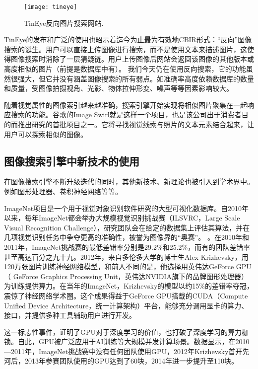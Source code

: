 \documentclass[bachelor_p]{hdu-thesis}
\begin{document}
\begin{figure}[!htb]
  \centering
  \texttt{[image: tineye]}
  \caption{TinEye反向图片搜索网站.}
  \label{fig_tineye}
\end{figure}

TinEye的发布和广泛的使用也昭示着迄今为止最为有效地CBIR形式：“反向”图像搜索的诞生。用户可以直接上传图像进行搜索，而不是使用文本来描述图片，这使得图像搜索时消除了一层猜疑链。用户上传图像后网站会返回该图像的其他版本或高度相似的图片（前提是数据库中有）。 我们今天仍在使用反向搜索，它的功能虽然很强大，但它并没有涵盖图像搜索的所有弱点。如准确率高度依赖数据库的数量和质量，受图像拍摄视角、光影、物体拉伸形变、噪声等等因素影响较大。 

随着视觉属性的图像索引越来越准确，搜索引擎开始实现将相似图片聚集在一起响应搜索的功能。谷歌的Image Swirl就是这样一个项目，也是该公司出于消费者目的而推出研究的首批项目之一。它将寻找视觉线索与照片的文本元素结合起来，让用户可以探索相似的图像。

\subsection{图像搜索引擎中新技术的使用}

在图像搜索引擎不断升级迭代的同时，其他新技术、新理论也被引入到学术界中。例如图形处理器、卷积神经网络等等。

ImageNet项目是一个用于视觉对象识别软件研究的大型可视化数据库。自2010年以来，每年ImageNet都会举办大规模视觉识别挑战赛（ILSVRC，Large Scale Visual Recognition Challenge），研究团队会在给定的数据集上评估其算法，并在几项视觉识别任务中争夺更高的准确性，被誉为图像界的“奥赛”。 \citep{BaiduImageNet}。在2010年和2011年，ImageNet挑战赛的最低差错率分别是29.2$\%$和25.2$\%$，而有的团队差错率甚至高达百分之九十九。2012年，来自多伦多大学的博士生Alex Krizhevsky，用120万张图片训练神经网络模型，和前人不同的是，他选择用英伟达GeForce GPU（ GeForce Graphics Processing Unit，英伟达NVIDIA旗下的品牌图形处理器）为训练提供算力。在当年的ImageNet，Krizhevsky的模型以约15$\%$的差错率夺冠，震惊了神经网络学术圈。这个成果得益于GeForce GPU搭载的CUDA（Compute Unified Device Architecture，统一计算架构）平台，能够充分调用显卡的算力、接口，并提供多种工具辅助用户进行开发。

这一标志性事件，证明了GPU对于深度学习的价值，也打破了深度学习的算力枷锁。自此，GPU被广泛应用于AI训练等大规模并发计算场景。数据显示，在2010—2011年，ImageNet挑战赛中没有任何团队使用GPU，2012年Krizhevsky首开先河后，2013年参赛团队使用的GPU达到了60块，2014年进一步提升至110块。
\end{document}
